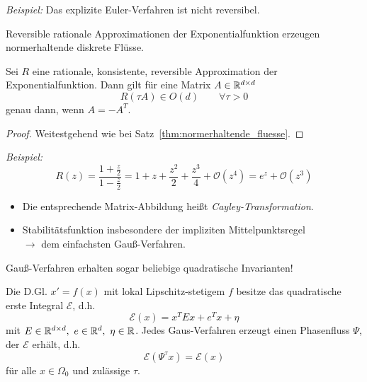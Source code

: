 \emph{Beispiel:} Das explizite Euler-Verfahren ist nicht reversibel.

\medskip

Reversible rationale Approximationen der Exponentialfunktion erzeugen normerhaltende diskrete Flüsse.

\begin{satz}[Db\,\&\,Bo 6.21]
	Sei $R$ eine rationale, konsistente, reversible Approximation der Exponentialfunktion. Dann gilt für eine Matrix $A\in\mathbb R^{d\times d}$
	\begin{equation*}
		R(\tau A)\in O(d)\qquad\forall \tau > 0
	\end{equation*}
	genau dann, wenn $A=-A^T$.
\end{satz}
\begin{proof}
 Weitestgehend wie bei Satz~\ref{thm:normerhaltende_fluesse}.
\end{proof}
\emph{Beispiel:}
\begin{equation*}
	R(z) = \frac{1+\frac{z}{2}}{1-\frac{z}{2}}=1+z+\frac{z^2}{2} + \frac{z^3}{4} + \mathcal{O}(z^4) = e^z + \mathcal O(z^3)
\end{equation*}
\begin{itemize}
	\item Die entsprechende Matrix-Abbildung heißt \emph{Cayley-Transformation}.
	\item Stabilitätsfunktion insbesondere der impliziten Mittelpunktsregel\\
	$\rightarrow$ dem einfachsten Gauß-Verfahren.
\end{itemize}
Gauß-Verfahren erhalten sogar beliebige quadratische Invarianten!
\begin{satz}
	Die D.Gl. $x'=f(x)$ mit lokal Lipschitz-stetigem $f$ besitze das quadratische erste Integral $\mathcal E$, d.h.
	\begin{equation*}
		\mathcal E(x) = x^TEx + e^Tx + \eta
	\end{equation*}
	mit $E\in\R^{d\times d},\ e\in\R^d,\ \eta\in\R$. Jedes Gaus-Verfahren erzeugt einen Phasenfluss $\Psi$, der $\mathcal E$ erhält, d.h.
	\begin{equation*}
		\mathcal E(\Psi^\tau x) = \mathcal E(x)
	\end{equation*}
	für alle $x\in\Omega_0$ und  zulässige $\tau$.
\end{satz}
